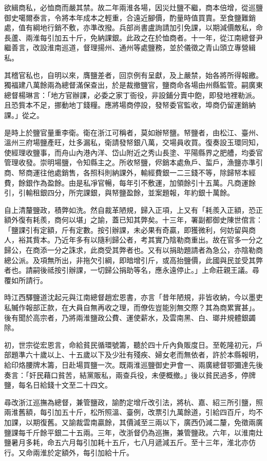 \begin{pinyinscope}
欲緝商私，必恤商而嚴其禁。故二年兩淮各場，因災灶鹽不繼，商本倍增，從巡鹽御史噶爾泰言，令將本年成本之輕重，合遠近腳價，酌量時值買賣。至食鹽難銷處，值有綱地行銷不敷，亦準改撥。兵部尚書盧詢請加引免課，以期減價敵私，命長蘆、兩淮每引加五十斤，免納課銀。此政之在於恤商者。十一年，從江南總督尹繼善言，改設淮南巡道，督理揚州、通州等處鹽務，並於儀徵之青山頭立專營緝私。

其稽官私也，自明以來，膺鹽差者，回京例有呈獻，及上嚴禁，始各將所得報繳。獨福建八萬餘兩為總督滿保查出，於是裁撤鹽官，鹽商命各場由州縣監管。嗣廣東總督楊琳言：「地方官辦課，必委之家丁衙役，非設鋪分賣中飽，即發地裡勒派。且恐貲本不足，挪動地丁錢糧。應將場商停設，發帑委官監收，埠商仍留運銷納課。」從之。

是時上於鹽官量重李衛。衛在浙江可稱者，莫如辦帑鹽。帑鹽者，由松江、臺州、溫州三府場鹽產旺，灶多漏私，衛請發帑銀八萬，交場員收買。復奏設玉環同知，使經理收鹽事，而舟山內港內洋、岱山附近之秀山長塗、平陽縣界之肥艚，均委官管理收發。崇明場鹽，令知縣主之。所收帑鹽，侭銷本處魚戶、蜇戶，漁鹽亦準引商、帑商運往他處銷售，各照科則納課外，輸經費銀一二三錢不等，除歸帑本經費，餘銀作為盈餘。由是私凈官暢，每年引不敷運，加領餘引十五萬。凡商運餘引，引輸租銀四分，所完課銀，與帑鹽盈餘，並案題報，年約銀十萬餘。

自上清釐鹽政，積弊如洗。然自裁革陋規，歸入正項，上又有「耗羨入正額，恐正額外復有耗羨，商何以堪」之諭，蓋已知其弊矣。十三年，署副都御史陳世倌言：「鹽課引有定額，斤有定數。按引辦課，未必果有奇贏，即獲微利，何妨留與商人，裕其貲本。乃近年多有以隨利歸公者，考其實乃陰勒商重出。故在官多一分之歸公，在商添一分之誅求，此商受其弊者也。又有以捐助題請者為急公，亦陰勒商總公派。及項無所出，非拖欠引綱，即暗增引斤，或高抬鹽價，此國與民並受其弊者也。請嗣後祗按引辦課，一切歸公捐助等名，應永遠停止。」上命莊親王議。尋覆如所請行。

時江西驛鹽道沈起元與江南總督趙宏恩書，亦言「昔年陋規，非皆收納，今以墨吏私贓作報部正款，在大員自無再收之理，而僚佐豈能別無交際？其為商累實甚」。後有聞於高宗者，乃將兩淮鹽政公費、運使薪水，及雲南黑、白、瑯井規體銀蠲除。

初，世宗從宏恩言，命給貧民循環號籌，聽於四十斤內負販度日。至乾隆初元，戶部題準六十歲以上、十五歲以下及少壯有殘疾、婦女老而無依者，許於本縣報明，給印烙腰牌木籌，日赴場買鹽一次。既兩淮巡鹽御史尹會一、兩廣總督鄂彌達先後奏言：「奸民藉口貧苦，結黨販私，兩查兵役，未便概撤。」後以貧民過多，停牌鹽，每名日給錢十文至二十四文。

尋改浙江巡撫為總督，兼管鹽政，諭酌定增斤改引法，將杭、嘉、紹三所引鹽，照兩淮舊額，每引加五十斤，松所照溫、臺例，改票引九萬餘道，引給四百斤，均不加課，以期復舊。又諭裁雲南贏餘，其價減至三兩以下，廣西仍減二釐，免徵兩廣鹽課每千斤餘平銀二十五兩。三年，改浙督仍為巡撫，兼管鹽政。六年，以淮南灶鹽暑月多耗，命五六月每引加耗十五斤，七八月遞減五斤。至十三年，淮北亦仿行。又命兩淮於定額外，每引加給十斤。


\end{pinyinscope}
